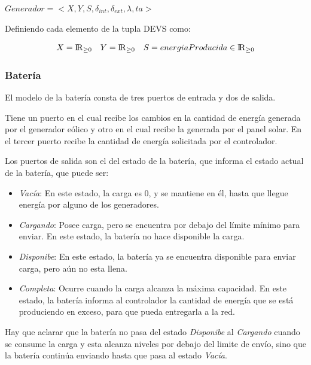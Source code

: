 $Generador = <X,Y,S,\delta_{int}, \delta_{ext}, \lambda, ta>$

Definiendo cada elemento de la tupla DEVS como:

\begin{align*}
X &= {\rm I\!R}_{\geq0} & Y &= {\rm I\!R}_{\geq0} & S &= energiaProducida \in {\rm I\!R}_{\geq 0} \\
\end{align*}




\subsubsection{Batería}
El modelo de la batería consta de tres puertos de entrada y dos de salida.

Tiene un puerto en el cual recibe los cambios en la cantidad de energía generada
por el generador eólico y otro en el cual recibe la generada por el panel solar.
En el tercer puerto recibe la cantidad de energía solicitada por el controlador.

Los puertos de salida son el del estado de la batería, que informa el estado actual
de la batería, que puede ser:

\begin{itemize}
    \item \emph{Vacía}: En este estado, la carga es 0, y se mantiene en él, hasta
        que llegue energía por alguno de los generadores.
    \item \emph{Cargando}: Posee carga, pero se encuentra por debajo del límite
        mínimo para enviar. En este estado, la batería no hace disponible la carga.
    \item \emph{Disponibe}: En este estado, la batería ya se encuentra disponible
        para enviar carga, pero aún no esta llena.
    \item \emph{Completa}: Ocurre cuando la carga alcanza la máxima capacidad. En este
        estado, la batería informa al controlador la cantidad de energía que se está
        produciendo en exceso, para que pueda entregarla a la red.
\end{itemize}

Hay que aclarar que la batería no pasa del estado \emph{Disponibe} al \emph{Cargando}
cuando se consume la carga y esta alcanza niveles por debajo del limite de envío, sino que
la batería continúa enviando hasta que pasa al estado \emph{Vacía}.

